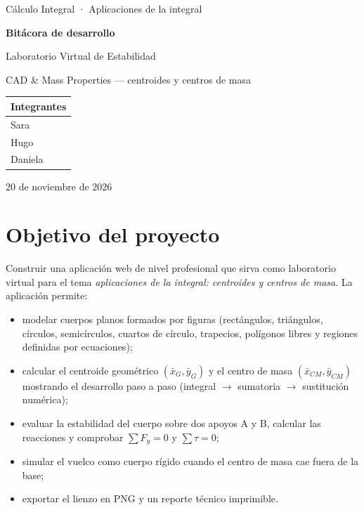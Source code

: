 \documentclass[11pt,a4paper]{article}
\begin{document}
\begin{titlepage}
  \centering
  \vspace*{2.5cm}
  {\sffamily\color{acento}\Large Cálculo Integral · Aplicaciones de la integral\par}
  \vspace{1.2cm}
  {\sffamily\bfseries\Huge Bitácora de desarrollo\par}
  \vspace{0.4cm}
  {\sffamily\LARGE Laboratorio Virtual de Estabilidad\par}
  {\sffamily\large\color{gris} CAD \& Mass Properties — centroides y centros de masa\par}
  \vspace{2.2cm}
  \begin{tabular}{l}
    \toprule
    \textbf{Integrantes}\\
    \midrule
    Sara\\
    Hugo\\
    Daniela\\
    \bottomrule
  \end{tabular}
  \vfill
  {\large 20 de noviembre de 2026\par}
\end{titlepage}

\tableofcontents
\newpage

\section{Objetivo del proyecto}

Construir una aplicación web de nivel profesional que sirva como laboratorio virtual para el tema
\emph{aplicaciones de la integral: centroides y centros de masa}. La aplicación permite:

\begin{itemize}
  \item modelar cuerpos planos formados por figuras (rectángulos, triángulos, círculos, semicírculos,
        cuartos de círculo, trapecios, polígonos libres y regiones definidas por ecuaciones);
  \item calcular el centroide geométrico $(\bar x_G,\bar y_G)$ y el centro de masa $(\bar x_{CM},\bar y_{CM})$
        mostrando el desarrollo paso a paso (integral $\rightarrow$ sumatoria $\rightarrow$ sustitución numérica);
  \item evaluar la estabilidad del cuerpo sobre dos apoyos A y B, calcular las reacciones y
        comprobar $\sum F_y = 0$ y $\sum\tau = 0$;
  \item simular el vuelco como cuerpo rígido cuando el centro de masa cae fuera de la base;
  \item exportar el lienzo en PNG y un reporte técnico imprimible.
\end{itemize}
\end{document}
